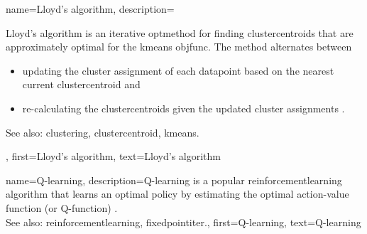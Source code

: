 {name={Lloyd's algorithm}, 
	description={Lloyd's algorithm is an iterative 
	   \gls{optmethod} for finding \glspl{clustercentroid} that are approximately 
	   optimal for the \gls{kmeans} \gls{objfunc}. The method 
	   alternates between
	   \begin{itemize} 
			\item updating the \gls{cluster} assignment of each \gls{datapoint} 
			      based on the nearest current \gls{clustercentroid} and 
			\item re-calculating the \glspl{clustercentroid} given the updated 
			      \gls{cluster} assignments \cite{Lloyd1982}.
		\end{itemize}
		See also: \gls{clustering}, \gls{clustercentroid}, \gls{kmeans}.},
	first={Lloyd's algorithm},
	text={Lloyd's algorithm} 
}

{name={Q-learning}, 
	description={Q-learning is a popular \gls{reinforcementlearning} 
	     \gls{algorithm} that learns an optimal policy by estimating the optimal action-value 
		function (or Q-function) \cite{SuttonEd2}.  \\
		See also: \gls{reinforcementlearning}, \gls{fixedpointiter}.},
	first={Q-learning},
	text={Q-learning} 
}

